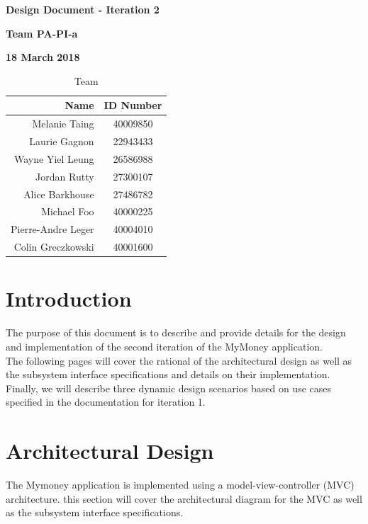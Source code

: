 \documentclass[12pt]{article}
\begin{document}
\newcommand{\code}[1]{\colorbox{light-gray}{\texttt{#1}}}

\vspace*{0.5in}
\centerline{\bf\Large Design Document - Iteration 2}

\vspace*{0.5in}
\centerline{\bf\Large Team PA-PI-a}

\vspace*{0.5in}
\centerline{\bf\Large 18 March 2018}

\vspace*{1.5in}
\begin{table}[htbp]
\caption{Team}
\begin{center}
\begin{tabular}{|r | c|}
\hline
Name & ID Number \\
\hline\hline
Melanie Taing & 40009850 \\
Laurie Gagnon & 22943433 \\
Wayne Yiel Leung & 26586988 \\
Jordan Rutty & 27300107 \\
Alice Barkhouse & 27486782 \\
Michael Foo & 40000225 \\
Pierre-Andre Leger & 40004010 \\
Colin Greczkowski & 40001600 \\
\hline
\end{tabular}
\end{center}
\end{table}

\clearpage

\tableofcontents

\clearpage

\section{Introduction}
The purpose of this document is to describe and provide details for the design and
implementation of the second iteration of the MyMoney application.\\

The following pages will cover the rational of the architectural design as well as the
subsystem interface specifications and details on their implementation. Finally, we will
describe three dynamic design scenarios based on use cases specified in the documentation
for iteration 1.

\section{Architectural Design} \label{sec:arch}
The Mymoney application is implemented using a model-view-controller (MVC) architecture. this section will cover the architectural diagram for the MVC as well as the subsystem interface specifications.
\newpage
\end{document}
